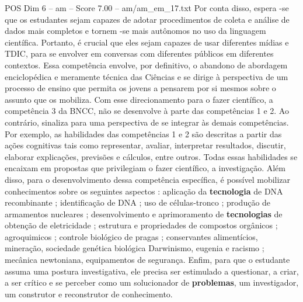 \begin{textsample}{POS Dim 6 – am – Score 7.00 – am/am\_em\_17.txt}
Por conta disso, espera -se que os estudantes sejam capazes de adotar procedimentos de coleta e análise de dados mais completos e tornem -se mais autônomos no uso da linguagem científica.
Portanto, é crucial que eles sejam capazes de usar diferentes mídias e TDIC, para se envolver em conversas com diferentes públicos em diferentes contextos.
Essa competência envolve, por definitivo, o abandono de abordagem enciclopédica e meramente técnica das Ciências e se dirige à perspectiva de um processo de ensino que permita os jovens a pensarem por si mesmos sobre o assunto que os mobiliza.
Com esse direcionamento para o fazer científico, a competência 3 da BNCC, não se desenvolve à parte das competências 1 e 2.
Ao contrário, sinaliza para uma perspectiva de se integrar às demais competências.
Por exemplo, as habilidades das competências 1 e 2 são descritas a partir das ações cognitivas tais como representar, avaliar, interpretar resultados, discutir, elaborar explicações, previsões e cálculos, entre outros.
Todas essas habilidades se encaixam em propostas que privilegiam o fazer científico, a investigação.
Além disso, para o desenvolvimento dessa competência específica, é possível mobilizar conhecimentos sobre os seguintes aspectos : aplicação da \textbf{tecnologia} de DNA recombinante ; identificação de DNA ; uso de células-tronco ; produção de armamentos nucleares ; desenvolvimento e aprimoramento de \textbf{tecnologias} de obtenção de eletricidade ; estrutura e propriedades de compostos orgânicos ; agroquimicos ; controle biológico de pragas ; conservantes alimentícios, mineração, sociedade genética biológica Darwinismo, eugenia e racismo ; mecânica newtoniana, equipamentos de segurança.
Enfim, para que o estudante assuma uma postura investigativa, ele precisa ser estimulado a questionar, a criar, a ser crítico e se perceber como um solucionador de \textbf{problemas}, um investigador, um construtor e reconstrutor de conhecimento.

\end{textsample}
